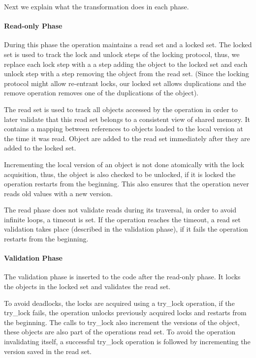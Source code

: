 Next we explain what the transformation does in each phase. 

\paragraph{Read-only Phase} 
  During this phase the operation maintains a read set 
  and a locked set. 
  The locked set is used to track the lock and unlock steps
  of the locking protocol, thus, we replace each lock step 
  with a a step adding the object to the locked set and each
  unlock step with a step removing the object from the read
  set. (Since the locking protocol might allow re-entrant locks, 
  our locked set allows duplications and the remove operation
  removes one of the duplications of the object).  
  
The read set is used to track all objects accessed by the 
operation in order to later validate that this read set
belongs to a consistent view of shared memory.  
It contains a mapping between references to objects loaded 
to the local version at the time it was read. Object are 
added to the read set immediately after they are added to 
the locked set.  

Incrementing the local version of an object is not 
done atomically with the lock acquisition, thus, 
the object is also checked to be unlocked, if it is locked
the operation restarts from the beginning. 
This also ensures that the operation never reads old values 
with a new version. 
 
The read phase does not validate reads during its traversal, 
in order to avoid infinite loops, a timeout is set. 
If the operation reaches the timeout, a read set 
validation takes place (described in the validation phase), 
if it fails the operation restarts from the beginning.
  

\paragraph{Validation Phase} 
The validation phase is inserted to the code after
the read-only phase. It locks the objects in the locked set
and validates the read set. 

To avoid deadlocks, the locks are acquired using a try\_lock
operation, if the try\_lock fails, the operation unlocks 
previously acquired locks and restarts from the beginning. 
The calls to try\_lock also increment the versions 
of the object,  these objects are also part of the 
operations read set. 
To avoid the operation invalidating itself, 
a successful try\_lock operation is followed by incrementing
the version saved in the read set.  

